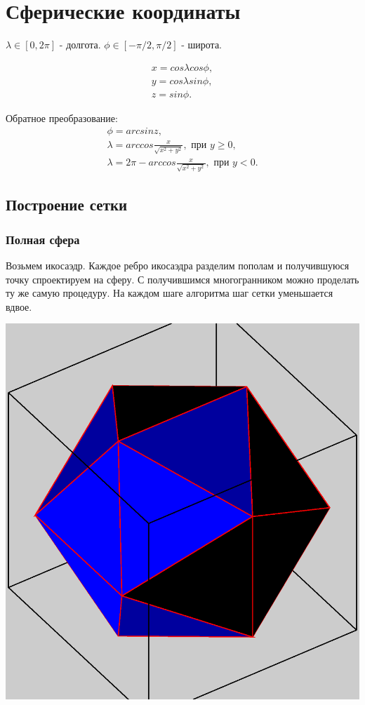 \documentclass[a4paper,article]{article}
\begin{document}
\tableofcontents
\section{Сферические координаты}
$\lambda \in [0,2\pi]$ - долгота. $\phi \in [-\pi/2,\pi/2]$ - широта.

\begin{equation*}
\begin{split}
x = cos \lambda cos \phi, \\
y = cos \lambda sin \phi, \\
z = sin \phi. 
\end{split}
\end{equation*}

Обратное преобразование:
\begin{equation*}
\begin{split}
\phi = arcsin z, \\
\lambda = arccos \frac{x}{\sqrt{x^2+y^2}}, \text{ при } y \ge 0,\\
\lambda = 2 \pi - arccos \frac{x}{\sqrt{x^2+y^2}}, \text{ при } y < 0.
\end{split}
\end{equation*}

\subsection{Построение сетки}
\subsubsection{Полная сфера}
Возьмем икосаэдр. Каждое ребро икосаэдра разделим пополам и получившуюся точку спроектируем на сферу. С получившимся многогранником можно проделать ту же самую процедуру. На каждом шаге алгоритма шаг сетки уменьшается вдвое.

\includegraphics[scale=0.5]{icosahedron.eps}
\end{document}
